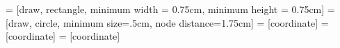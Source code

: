 \usetikzlibrary{shapes, fit, arrows, calc, positioning}

 = [draw, rectangle, minimum width = 0.75cm, minimum height = 0.75cm]
 = [draw, circle, minimum size=.5cm, node distance=1.75cm]
 = [coordinate]
 = [coordinate]
 = [coordinate]